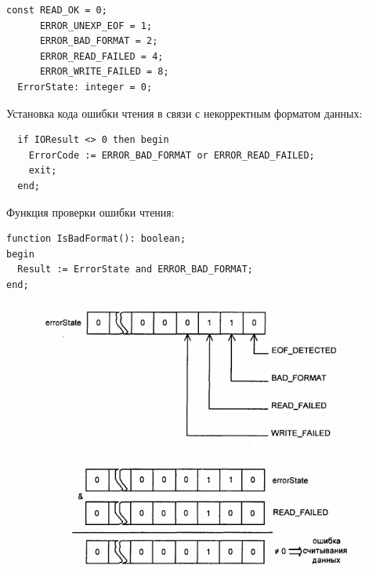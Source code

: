 \documentclass[xcolor=table]{beamer}
\begin{document}
\begin{frame}[fragile]
	\begin{verbatim}
const READ_OK = 0;
      ERROR_UNEXP_EOF = 1;
      ERROR_BAD_FORMAT = 2;
      ERROR_READ_FAILED = 4;
      ERROR_WRITE_FAILED = 8;
  ErrorState: integer = 0; 
	\end{verbatim}
	Установка кода ошибки чтения в связи с некорректным форматом данных:
	\begin{verbatim}
  if IOResult <> 0 then begin
    ErrorCode := ERROR_BAD_FORMAT or ERROR_READ_FAILED;
    exit;
  end; 
	\end{verbatim}
	Функция проверки ошибки чтения:
	\begin{verbatim}
function IsBadFormat(): boolean;
begin
  Result := ErrorState and ERROR_BAD_FORMAT;
end; 
	\end{verbatim}
\end{frame}

\begin{frame}
	\begin{figure}[h]
		\centering
		\includegraphics[scale=0.6]{images/lec08-pic03.png}
	\end{figure}
\end{frame}
\end{document}
